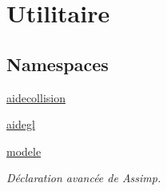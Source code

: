 \hypertarget{group__utilitaire}{}\section{Utilitaire}
\label{group__utilitaire}
\subsection*{Namespaces}
\begin{DoxyCompactItemize}
\item 
 \hyperlink{namespaceaidecollision}{aidecollision}
\item 
 \hyperlink{namespaceaidegl}{aidegl}
\item 
 \hyperlink{namespacemodele}{modele}
\begin{DoxyCompactList}\small\item\em Déclaration avancée de Assimp. \end{DoxyCompactList}\end{DoxyCompactItemize}
